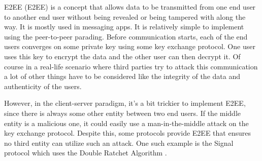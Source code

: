 E2EE (\acl{E2EE}) is a concept that allows data to be transmitted from one end user to another end user without being revealed or being tampered with along the way. It is mostly used in messaging apps. It is relatively simple to implement using the peer-to-peer parading. Before communication starts, each of the end users converges on some private key using some key exchange protocol. One user uses this key to encrypt the data and the other user can then decrypt it. Of course in a real-life scenario where third parties try to attack this communication a lot of other things have to be considered like the integrity of the data and authenticity of the users.

However, in the client-server paradigm, it's a bit trickier to implement E2EE, since there is always some other entity between two end users. If the middle entity is a malicious one, it could easily use a man-in-the-middle attack on the key exchange protocol. Despite this, some protocols provide E2EE that ensures no third entity can utilize such an attack. One such example is the Signal protocol which uses the Double Ratchet Algorithm \cite{Marlinspike2016}.
